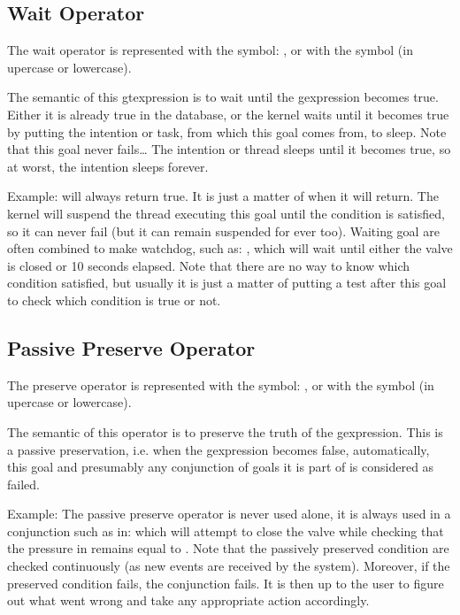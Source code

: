 \subsection{Wait Operator}

The wait operator is represented with the symbol: \samp{\^{}}, or with the
symbol  (in upercase or lowercase).

The semantic of this gtexpression is to wait until the gexpression becomes
true. Either it is already true in the database, or the kernel waits until it
becomes true by putting the intention or task, from which this goal comes from,
to sleep.  Note that this goal never fails\dots{} The intention or thread
sleeps until it becomes true, so at worst, the intention sleeps forever.

Example:  will always return true. It is just
a matter of when it will return. The kernel will suspend the thread executing
this goal until the condition is satisfied, so it can never fail (but it can
remain suspended for ever too). Waiting goal are often combined to make
watchdog, such as: , which will wait until either the valve is closed or 10 seconds elapsed.
Note that there are no way to know which condition satisfied, but usually it is
just a matter of putting a test after this goal to check which condition is
true or not.

\subsection{Passive Preserve Operator}

The preserve operator is represented with the symbol: \samp{\#}, or with the
symbol  (in upercase or lowercase).

The semantic of this operator is to preserve the truth of the
gexpression. This is a passive preservation, i.e. when the gexpression
becomes false, automatically, this goal and presumably any conjunction of
goals it is part of is considered as failed.

Example: The passive preserve operator is never used alone, it is always used in a
conjunction such as in:  which will attempt to close the valve while checking that the pressure
in  remains equal to . Note that the passively preserved
condition are checked continuously (as new events are received by the system).
Moreover, if the preserved condition fails, the conjunction fails. It is then
up to the user to figure out what went wrong and take any appropriate action
accordingly.

